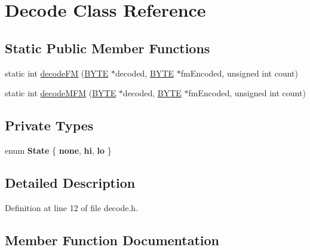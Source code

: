 \hypertarget{classDecode}{}\section{Decode Class Reference}
\label{classDecode}
\subsection*{Static Public Member Functions}
\begin{DoxyCompactItemize}
\item 
static int \hyperlink{classDecode_a287c55f9f9888c433d950c08254c1efe}{decode\+F\+M} (\hyperlink{hi__types_8h_aae9749d96e15ccb4f482dd5f55d98f9b}{B\+Y\+T\+E} $\ast$decoded, \hyperlink{hi__types_8h_aae9749d96e15ccb4f482dd5f55d98f9b}{B\+Y\+T\+E} $\ast$fm\+Encoded, unsigned int count)
\item 
static int \hyperlink{classDecode_ab154f17b196d8d2f3681756300da2f30}{decode\+M\+F\+M} (\hyperlink{hi__types_8h_aae9749d96e15ccb4f482dd5f55d98f9b}{B\+Y\+T\+E} $\ast$decoded, \hyperlink{hi__types_8h_aae9749d96e15ccb4f482dd5f55d98f9b}{B\+Y\+T\+E} $\ast$fm\+Encoded, unsigned int count)
\end{DoxyCompactItemize}
\subsection*{Private Types}
\begin{DoxyCompactItemize}
\item 
\hypertarget{classDecode_a7f036dad7d20d6a279e48625eb635708}{}enum {\bfseries State} \{ {\bfseries none}, 
{\bfseries hi}, 
{\bfseries lo}
 \}\label{classDecode_a7f036dad7d20d6a279e48625eb635708}

\end{DoxyCompactItemize}


\subsection{Detailed Description}


Definition at line 12 of file decode.\+h.



\subsection{Member Function Documentation}
\hypertarget{classDecode_a287c55f9f9888c433d950c08254c1efe}{}
